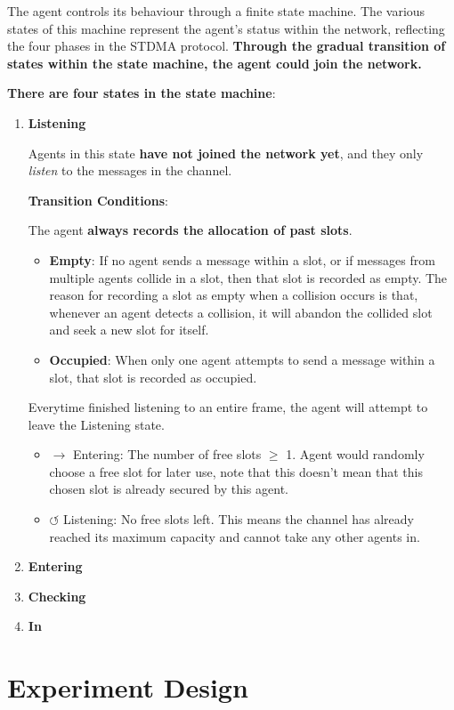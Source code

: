 The agent controls its behaviour through a finite state machine. 
The various states of this machine represent the agent's status within the network, reflecting the four phases in the STDMA protocol.
\textbf{Through the gradual transition of states within the state machine, the agent could join the network.}

\textbf{There are four states in the state machine}:

\begin{enumerate}
    \item \textbf{Listening}
    
    Agents in this state \textbf{have not joined the network yet}, and they only \textit{listen} to the messages in the channel.

    \textbf{Transition Conditions}:
    
    
    The agent \textbf{always records the allocation of past slots}.
    
    \begin{itemize}
        \item \textbf{Empty}: 
        If no agent sends a message within a slot, or if messages from multiple agents collide in a slot, then that slot is recorded as empty. The reason for recording a slot as empty when a collision occurs is that, whenever an agent detects a collision, it will abandon the collided slot and seek a new slot for itself. 
        \item \textbf{Occupied}: 
        When only one agent attempts to send a message within a slot, that slot is recorded as occupied.       
    \end{itemize}

    Everytime finished listening to an entire frame, the agent will attempt to leave the Listening state.
    
    \begin{itemize}
        \item $\rightarrow$ Entering: The number of free slots $\geq$ 1. Agent would randomly choose a free slot for later use, note that this doesn't mean that this chosen slot is already secured by this agent.
        \item $\circlearrowleft$ Listening: No free slots left. This means the channel has already reached its maximum capacity and cannot take any other agents in. 
    \end{itemize}

    \item \textbf{Entering}
    \item \textbf{Checking}
    \item \textbf{In}
\end{enumerate}




\section{Experiment Design}